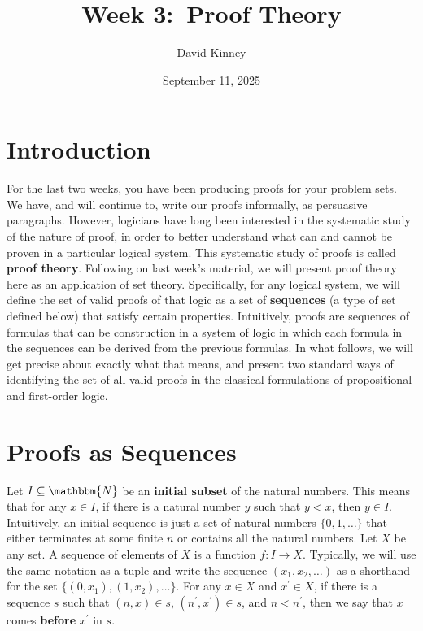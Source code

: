 \documentclass[11pt]{article}
\title{Week 3:\ Proof Theory}
\author{David Kinney}
\date{September 11, 2025}
\theoremstyle{definition}
\theoremstyle{remark}
\begin{document}
\maketitle

\section{Introduction}
For the last two weeks, you have been producing proofs for your problem sets. We have, and will continue to, write our proofs informally, as persuasive paragraphs. However, logicians have long been interested in the systematic study of the nature of proof, in order to better understand what can and cannot be proven in a particular logical system. This systematic study of proofs is called \textbf{proof theory}. Following on last week's material, we will present proof theory here as an application of set theory. Specifically, for any logical system, we will define the set of valid proofs of that logic as a set of \textbf{sequences} (a type of set defined below) that satisfy certain properties. Intuitively, proofs are sequences of formulas that can be construction in a system of logic in which each formula in the sequences can be derived from the previous formulas. In what follows, we will get precise about exactly what that means, and present two standard ways of identifying the set of all valid proofs in the classical formulations of propositional and first-order logic.\par 


\section{Proofs as Sequences}
Let $I\subseteq\mathbbm{N}$ be an \textbf{initial subset} of the natural numbers. This means that for any $x\in I$, if there is a natural number $y$ such that $y<x$, then $y\in I$. Intuitively, an initial sequence is just a set of natural numbers $\{0,1,\dots\}$ that either terminates at some finite $n$ or contains all the natural numbers. Let $X$ be any set. A sequence of elements of $X$ is a function $f:I\rightarrow X$. Typically, we will use the same notation as a tuple and write the sequence $(x_{1},x_{2},\dots)$ as a shorthand for the set $\{(0,x_{1}),(1,x_{2}),\dots\}$. For any $x\in X$ and $x^{\prime}\in X$, if there is a sequence $s$ such that $(n,x)\in s$, $(n^{\prime},x^{\prime})\in s$, and $n<n^{\prime}$, then we say that $x$ comes \textbf{before} $x^{\prime}$ in $s$.\par 
\end{document}

